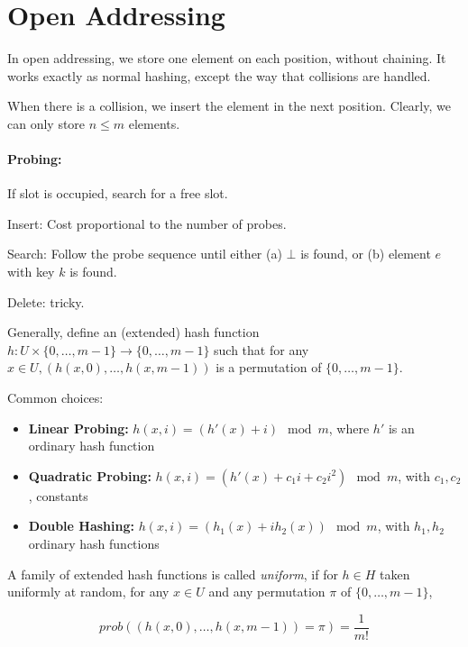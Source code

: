 \newpage 
\section{Open Addressing}

In open addressing, we store one element on each position, without chaining. It works exactly as normal hashing, except the way that collisions are handled.

When there is a collision, we insert the element in the next position. Clearly, we can only store $n \le m$ elements.

\paragraph{Probing:} If slot is occupied, search for a free slot.

\bigskip \noindent Insert: Cost proportional to the number of probes.

\bigskip \noindent Search: Follow the probe sequence until either (a) $\bot$ is found, or (b) element $e$ with key $k$ is found.

\bigskip \noindent Delete: tricky.


\bigskip \noindent Generally, define an (extended) hash function $h: U \times \{0, \ldots, m-1\} \rightarrow \{0, \ldots, m-1\}$ such that for any $x \in U, (h(x, 0), \ldots, h(x,m-1))$ is a permutation of $\{0, \ldots, m-1\}$.

Common choices:

\begin{itemize}
\item \textbf{Linear Probing:} $h(x, i) = (h'(x) + i) \mod m$, where $h'$ is an ordinary hash function
\item \textbf{Quadratic Probing:} $h(x, i) = (h'(x) + c_1 i + c_2 i^2) \mod m$, with $c_1, c_2$, constants
\item \textbf{Double Hashing:} $h(x, i) = (h_1(x) + i h_2(x)) \mod m$, with $h_1, h_2$ ordinary hash functions
\end{itemize}

\begin{mydefinition}
A family of extended hash functions is called \emph{uniform}, if for $h \in H$ taken uniformly at random, for any $x \in U$ and any permutation $\pi$ of $\{0, \ldots, m-1\}$,

$${prob}((h(x,0), \ldots, h(x, m-1)) = \pi) = \frac{1}{m!}$$
\end{mydefinition}

